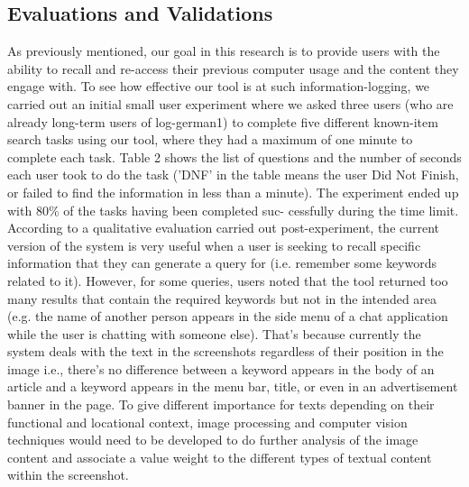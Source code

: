 \subsection{Evaluations and Validations}
As previously mentioned, our goal in this research is to provide users with the ability to recall and re-access their previous computer usage and the content they engage with. To see how effective our tool is at such information-logging, we carried out an initial small user experiment where we asked three users (who are already long-term users of log-german1) to complete five different known-item search tasks using our tool, where they had a maximum of one minute to complete each task. Table 2 shows the list of questions and the number of seconds each user took to do the task (’DNF’ in the table means the user Did Not Finish, or failed to find the information in less than a minute). The experiment ended up with 80\% of the tasks having been completed suc- cessfully during the time limit. According to a qualitative evaluation carried out post-experiment, the current version of the system is very useful when a user is seeking to recall specific information that they can generate a query for (i.e. remember some keywords related to it). However, for some queries, users noted that the tool returned too many results that contain the required keywords but not in the intended area (e.g. the name of another person appears in the side menu of a chat application while the user is chatting with someone else). That’s because currently the system deals with the text in the screenshots regardless of their position in the image i.e., there’s no difference between a keyword appears in the body of an article and a keyword appears in the menu bar, title, or even in an advertisement banner in the page. To give different importance for texts depending on their functional and locational context, image processing and computer vision techniques would need to be developed to do further analysis of the image content and associate a value weight to the different types of textual content within the screenshot.
